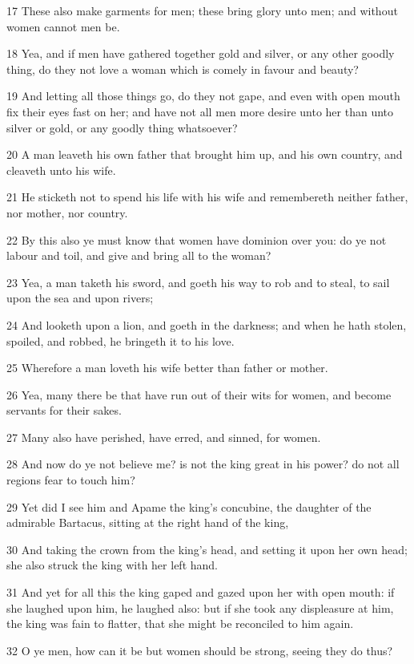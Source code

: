 \par 17 These also make garments for men; these bring glory unto men; and without women cannot men be.
\par 18 Yea, and if men have gathered together gold and silver, or any other goodly thing, do they not love a woman which is comely in favour and beauty?
\par 19 And letting all those things go, do they not gape, and even with open mouth fix their eyes fast on her; and have not all men more desire unto her than unto silver or gold, or any goodly thing whatsoever?
\par 20 A man leaveth his own father that brought him up, and his own country, and cleaveth unto his wife.
\par 21 He sticketh not to spend his life with his wife and remembereth neither father, nor mother, nor country.
\par 22 By this also ye must know that women have dominion over you: do ye not labour and toil, and give and bring all to the woman?
\par 23 Yea, a man taketh his sword, and goeth his way to rob and to steal, to sail upon the sea and upon rivers;
\par 24 And looketh upon a lion, and goeth in the darkness; and when he hath stolen, spoiled, and robbed, he bringeth it to his love.
\par 25 Wherefore a man loveth his wife better than father or mother.
\par 26 Yea, many there be that have run out of their wits for women, and become servants for their sakes.
\par 27 Many also have perished, have erred, and sinned, for women.
\par 28 And now do ye not believe me? is not the king great in his power? do not all regions fear to touch him?
\par 29 Yet did I see him and Apame the king's concubine, the daughter of the admirable Bartacus, sitting at the right hand of the king,
\par 30 And taking the crown from the king's head, and setting it upon her own head; she also struck the king with her left hand.
\par 31 And yet for all this the king gaped and gazed upon her with open mouth: if she laughed upon him, he laughed also: but if she took any displeasure at him, the king was fain to flatter, that she might be reconciled to him again.
\par 32 O ye men, how can it be but women should be strong, seeing they do thus?
